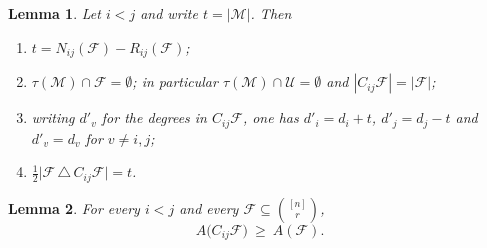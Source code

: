 \documentclass[10pt,a4paper]{amsart}
\newtheorem{lemma}{Lemma}
\newcommand{\F}{\mathcal{F}}
\newcommand{\M}{\mathcal{M}}
\newcommand{\Uu}{\mathcal{U}}
\begin{document}
\begin{lemma}\label{lem:basic}
Let $i<j$ and write $t=|\M|$. Then
\begin{enumerate}
\item[(a)] $t=N_{ij}(\F)-R_{ij}(\F)$;
\item[(b)] $\tau(\M)\cap\F=\emptyset$; in particular $\tau(\M)\cap\Uu=\emptyset$ and
$|C_{ij}\F|=|\F|$;
\item[(c)] writing $d'_v$ for the degrees in $C_{ij}\F$, one has $d'_i=d_i+t$, $d'_j=d_j-t$ and
$d'_v=d_v$ for $v\ne i,j$;
\item[(d)] $\tfrac12\bigl|\F\,\triangle\,C_{ij}\F\bigr|=t$.
\end{enumerate}
\end{lemma}

\begin{lemma}\label{lem:Amonotone}
For every $i<j$ and every $\F\subseteq\binom{[n]}{r}$,
\[
A\bigl(C_{ij}\F\bigr)\ \ge\ A(\F).
\]
\end{lemma}
\end{document}
